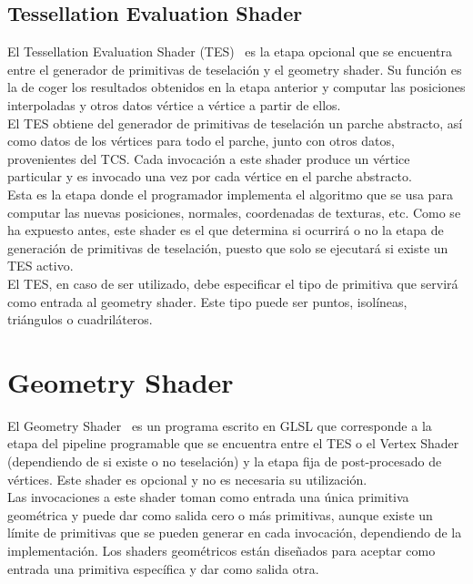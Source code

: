 \subsection{Tessellation Evaluation Shader}
\label{ref:TesEvaShader}

El Tessellation Evaluation Shader (TES)~\cite{TesEvaShader} es la etapa opcional
que se encuentra entre el generador de primitivas de teselación y el geometry
shader. Su función es la de coger los resultados obtenidos en la etapa anterior
y computar las posiciones interpoladas y otros datos vértice a vértice a partir
de ellos.\\

El TES obtiene del generador de primitivas de teselación un parche abstracto,
así como datos de los vértices para todo el parche, junto con otros datos,
provenientes del TCS. Cada invocación a este shader produce un vértice
particular y es invocado una vez por cada vértice en el parche abstracto.\\

Esta es la etapa donde el programador implementa el algoritmo que se usa para
computar las nuevas posiciones, normales, coordenadas de texturas, etc. Como se
ha expuesto antes, este shader es el que determina si ocurrirá o no la etapa de
generación de primitivas de teselación, puesto que solo se ejecutará si existe
un TES activo.\\

El TES, en caso de ser utilizado, debe especificar el tipo de primitiva que
servirá como entrada al geometry shader. Este tipo puede ser puntos, isolíneas,
triángulos o cuadriláteros.

\section{Geometry Shader}
\label{ref:GeoShader}

El Geometry Shader~\cite{GeoShader} es un programa escrito en GLSL que
corresponde a la etapa del pipeline programable que se encuentra entre el TES o
el Vertex Shader (dependiendo de si existe o no teselación) y la etapa fija de
post-procesado de vértices. Este shader es opcional y no es necesaria su
utilización.\\

Las invocaciones a este shader toman como entrada una única primitiva geométrica
y puede dar como salida cero o más primitivas, aunque existe un límite de
primitivas que se pueden generar en cada invocación, dependiendo de la
implementación. Los shaders geométricos están diseñados para aceptar como
entrada una primitiva específica y dar como salida otra. \\

